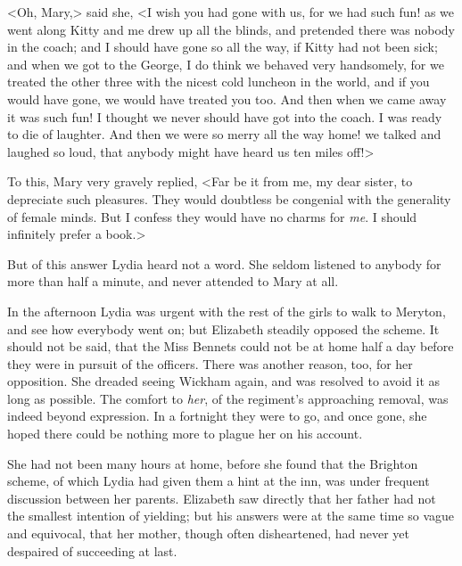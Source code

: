 <Oh, Mary,> said she, <I wish you had gone with us, for we had such fun! as we went along Kitty and me drew up all the blinds, and pretended there was nobody in the coach; and I should have gone so all the way, if Kitty had not been sick; and when we got to the George, I do think we behaved very handsomely, for we treated the other three with the nicest cold luncheon in the world, and if you would have gone, we would have treated you too. And then when we came away it was such fun! I thought we never should have got into the coach. I was ready to die of laughter. And then we were so merry all the way home! we talked and laughed so loud, that anybody might have heard us ten miles off!>

To this, Mary very gravely replied, <Far be it from me, my dear sister, to depreciate such pleasures. They would doubtless be congenial with the generality of female minds. But I confess they would have no charms for \textit{me}. I should infinitely prefer a book.>

But of this answer Lydia heard not a word. She seldom listened to anybody for more than half a minute, and never attended to Mary at all.

In the afternoon Lydia was urgent with the rest of the girls to walk to Meryton, and see how everybody went on; but Elizabeth steadily opposed the scheme. It should not be said, that the Miss Bennets could not be at home half a day before they were in pursuit of the officers. There was another reason, too, for her opposition. She dreaded seeing Wickham again, and was resolved to avoid it as long as possible. The comfort to \textit{her}, of the regiment's approaching removal, was indeed beyond expression. In a fortnight they were to go, and once gone, she hoped there could be nothing more to plague her on his account.

She had not been many hours at home, before she found that the Brighton scheme, of which Lydia had given them a hint at the inn, was under frequent discussion between her parents. Elizabeth saw directly that her father had not the smallest intention of yielding; but his answers were at the same time so vague and equivocal, that her mother, though often disheartened, had never yet despaired of succeeding at last.
